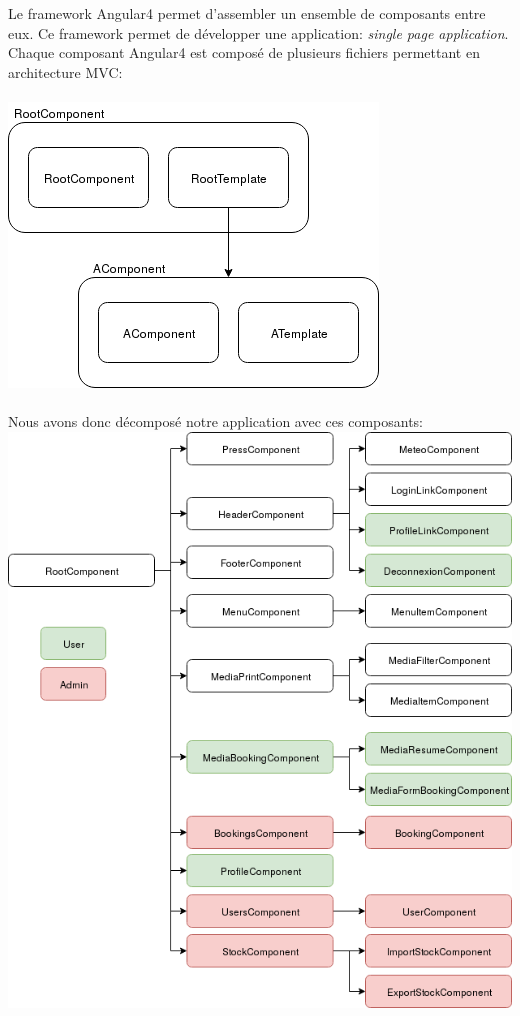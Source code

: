 \documentclass{article}
\begin{document}
  Le framework Angular4 permet d'assembler un ensemble de composants entre eux. Ce
  framework permet de développer une application: \emph{single page application}.
  Chaque composant Angular4 est composé de plusieurs fichiers permettant en architecture MVC:\\ \\
  \includegraphics[scale=0.6]{angular_component.png}\\ \\
  Nous avons donc décomposé notre application avec ces composants:\\
  \includegraphics[scale=0.5]{allcomponent.png}
\end{document}
